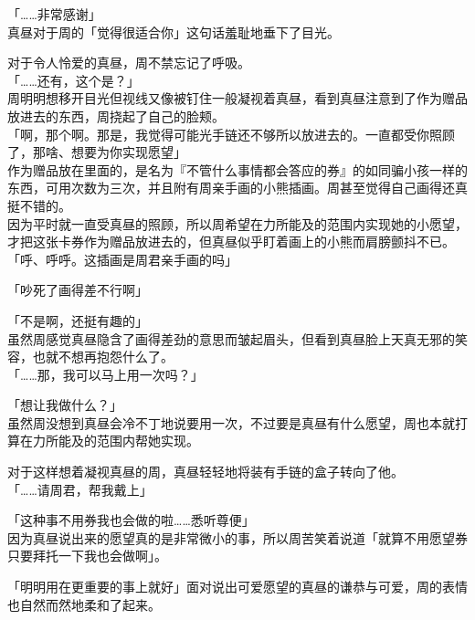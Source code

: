 「……非常感谢」\\

真昼对于周的「觉得很适合你」这句话羞耻地垂下了目光。

对于令人怜爱的真昼，周不禁忘记了呼吸。\\

「……还有，这个是？」\\

周明明想移开目光但视线又像被钉住一般凝视着真昼，看到真昼注意到了作为赠品放进去的东西，周挠起了自己的脸颊。\\

「啊，那个啊。那是，我觉得可能光手链还不够所以放进去的。一直都受你照顾了，那啥、想要为你实现愿望」\\

作为赠品放在里面的，是名为『不管什么事情都会答应的券』的如同骗小孩一样的东西，可用次数为三次，并且附有周亲手画的小熊插画。周甚至觉得自己画得还真挺不错的。\\

因为平时就一直受真昼的照顾，所以周希望在力所能及的范围内实现她的小愿望，才把这张卡券作为赠品放进去的，但真昼似乎盯着画上的小熊而肩膀颤抖不已。\\

「呼、呼呼。这插画是周君亲手画的吗」

「吵死了画得差不行啊」

「不是啊，还挺有趣的」\\

虽然周感觉真昼隐含了画得差劲的意思而皱起眉头，但看到真昼脸上天真无邪的笑容，也就不想再抱怨什么了。\\

「……那，我可以马上用一次吗？」

「想让我做什么？」\\

虽然周没想到真昼会冷不丁地说要用一次，不过要是真昼有什么愿望，周也本就打算在力所能及的范围内帮她实现。

对于这样想着凝视真昼的周，真昼轻轻地将装有手链的盒子转向了他。\\

「……请周君，帮我戴上」

「这种事不用券我也会做的啦……悉听尊便」\\

因为真昼说出来的愿望真的是非常微小的事，所以周苦笑着说道「就算不用愿望券只要拜托一下我也会做啊」。

「明明用在更重要的事上就好」面对说出可爱愿望的真昼的谦恭与可爱，周的表情也自然而然地柔和了起来。\\

